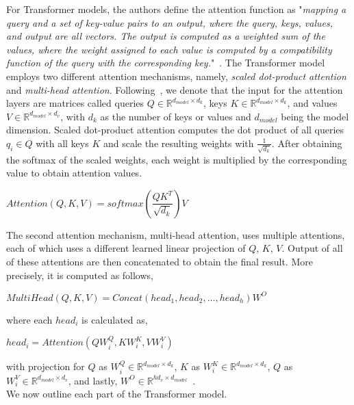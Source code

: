 For Transformer models, the authors define the attention function as "\emph{mapping a query and a set of key-value pairs to an output, where the query, keys, values, and output are all vectors. The output is computed as a weighted sum of the values, where the weight assigned to each value is computed by a compatibility function of the query with the corresponding key.}"~\parencite{AttentionIsAllYouNeed_Vaswani}. The Transformer model employs two different attention mechanisms, namely, \emph{scaled dot-product attention} and \emph{multi-head attention}. Following~\parencite{AttentionIsAllYouNeed_Vaswani}, we denote that the input for the attention layers are matrices called queries $Q \in \mathbb{R}^{d_{model} \times d_k}$, keys $K \in \mathbb{R}^{d_{model} \times d_k}$, and values $V \in \mathbb{R}^{d_{model} \times d_v}$, with $d_k$ as the number of keys or values and $d_{model}$ being the model dimension. Scaled dot-product attention computes the dot product of all queries $q_i \in Q$ with all keys $K$ and scale the resulting weights with $\frac{1}{\sqrt{d_k}}$. After obtaining the softmax of the scaled weights, each weight is multiplied by the corresponding value to obtain attention values.
\begin{center}
    $Attention(Q, K, V) = softmax(\dfrac{QK^T}{\sqrt{d_k}})V$
\end{center}
The second attention mechanism, multi-head attention, uses multiple attentions, each of which uses a different learned linear projection of $Q$, $K$, $V$. Output of all of these attentions are then concatenated to obtain the final result. More precisely, it is computed as follows,
\begin{center}
    $MultiHead(Q, K, V) = Concat(head_1, head_2, \dots, head_h)W^{O}$
\end{center}
where each $head_i$ is calculated as,
\begin{center}
    $head_i = Attention(QW_i^Q, KW_i^K, VW_i^V)$
\end{center}
with projection for $Q$ as $W_i^Q \in \mathbb{R}^{d_{model} \times d_k}$, $K$ as $W_i^K \in \mathbb{R}^{d_{model} \times d_k}$, $Q$ as $W_i^V \in \mathbb{R}^{d_{model} \times d_v}$, and lastly, $W^{O} \in \mathbb{R}^{hd_v \times d_{model}}$~\parencite{AttentionIsAllYouNeed_Vaswani}.\\
We now outline each part of the Transformer model.\\
